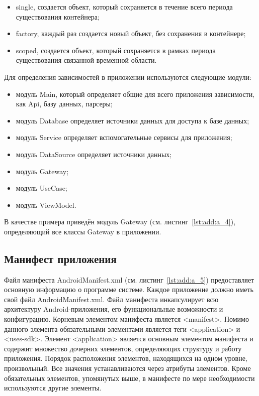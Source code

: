 \begin{itemize}
  \item single, создается объект, который сохраняется в течение всего периода существования контейнера;
  \item factory, каждый раз создается новый объект, без сохранения в контейнере;
  \item scoped, создается объект, который сохраняется в рамках периода существования связанной временной области.
\end{itemize}

Для определения зависимостей в приложении используются следующие модули:
\begin{itemize}
  \item модуль Main, который определяет общие для всего приложения зависимости, как Api, базу данных, парсеры;
  \item модуль Database определяет источники данных для доступа к базе данных;
  \item модуль Service определяет вспомогательные сервисы для приложения;
  \item модуль DataSource определяет источники данных;
  \item модуль Gateway;
  \item модуль UseCase;
  \item модуль ViewModel.
\end{itemize}


В качестве примера приведён модуль Gateway (см. листинг~\ref{lst:add:a_4}), определяющий все классы Gateway в приложении.

\subsection{Манифест приложения}
Файл манифеста AndroidManifest.xml (см. листинг~\ref{lst:add:a_5}) предоставляет основную информацию о программе системе. Каждое приложение должно иметь свой файл AndroidManifest.xml. Файл манифеста инкапсулирует всю архитектуру Android-приложения, его функциональные возможности и конфигурацию. Корневым элементом манифеста является <manifest>. Помимо данного элемента обязательными элементами является теги <application> и <uses-sdk>. Элемент <application> является основным элементом манифеста и содержит множество дочерних элементов, определяющих структуру и работу приложения. Порядок расположения элементов, находящихся на одном уровне, произвольный. Все значения устанавливаются через атрибуты элементов. Кроме обязательных элементов, упомянутых выше, в манифесте по мере необходимости используются другие элементы.

